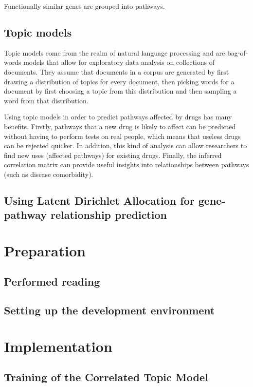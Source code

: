 \documentclass[12pt,a4paper,twoside,openright]{report}
\begin{document}
Functionally similar genes are grouped into pathways.

\section{Topic models}

Topic models come from the realm of natural language processing and are bag-of-words models that allow for exploratory data analysis on collections of documents. They assume that documents in a corpus are generated by first drawing a distribution of topics for every document, then picking words for a document by first choosing a topic from this distribution and then sampling a word from that distribution.

Using topic models in order to predict pathways affected by drugs has many benefits. Firstly, pathways that a new drug is likely to affect can be predicted without having to perform tests on real people, which means that useless drugs can be rejected quicker. In addition, this kind of analysis can allow researchers to find new uses (affected pathways) for existing drugs. Finally, the inferred correlation matrix can provide useful insights into relationships between pathways (such as disease comorbidity).

\section{Using Latent Dirichlet Allocation for gene-pathway relationship prediction}

\chapter{Preparation}

\section{Performed reading}

\section{Setting up the development environment}

\chapter{Implementation}

\section{Training of the Correlated Topic Model}
\end{document}
